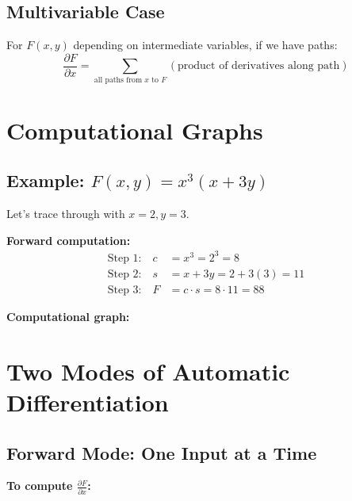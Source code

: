 \documentclass[11pt]{article}
\begin{document}
\subsection{Multivariable Case}
For $F(x,y)$ depending on intermediate variables, if we have paths:
\begin{equation}
\frac{\partial F}{\partial x} = \sum_{\text{all paths from } x \text{ to } F} \left(\text{product of derivatives along path}\right)
\end{equation}

\section{Computational Graphs}

\subsection{Example: $F(x,y) = x^3(x + 3y)$}
Let's trace through with $x = 2, y = 3$.

\textbf{Forward computation:}
\begin{align}
\text{Step 1:} \quad c &= x^3 = 2^3 = 8\\
\text{Step 2:} \quad s &= x + 3y = 2 + 3(3) = 11\\
\text{Step 3:} \quad F &= c \cdot s = 8 \cdot 11 = 88
\end{align}

\textbf{Computational graph:}
\begin{center}
\end{center}

\section{Two Modes of Automatic Differentiation}

\subsection{Forward Mode: One Input at a Time}
\textbf{To compute $\frac{\partial F}{\partial x}$:}
\end{document}
